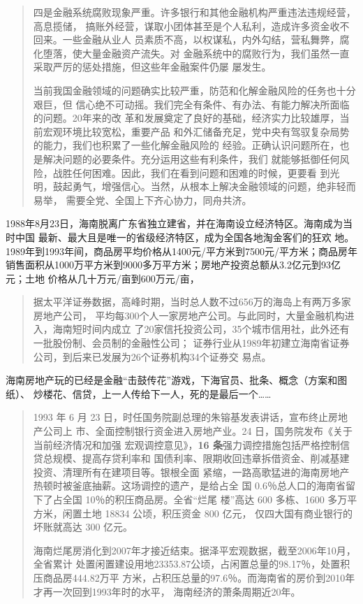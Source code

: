 \begin{quotation}
  四是金融系统腐败现象严重。许多银行和其他金融机构严重违法违规经营，高息揽储，
  搞账外经营，谋取小团体甚至是个人私利，造成许多资金收不回来。一些金融从业人
  员素质不高，以权谋私，内外勾结，营私舞弊，腐化堕落，使大量金融资产流失。对
  金融系统中的腐败行为，我们虽然一直采取严厉的惩处措施，但这些年金融案件仍屡
  屡发生。

  当前我国金融领域的问题确实比较严重，防范和化解金融风险的任务也十分艰巨，但
  信心绝不可动摇。我们完全有条件、有办法、有能力解决所面临的问题。20年来的改
  革和发展奠定了良好的基础，经济实力比较雄厚，当前宏观环境比较宽松，重要产品
  和外汇储备充足，党中央有驾驭复杂局势的能力，我们也积累了一些化解金融风险的
  经验。正确认识问题所在，也是解决问题的必要条件。充分运用这些有利条件，我们
  就能够抵御任何风险，战胜任何困难。因此，我们在看到问题和困难的时候，更要看
  到光明，鼓起勇气，增强信心。当然，从根本上解决金融领域的问题，绝非轻而易举，
  需要全党、全国上下齐心协力，同舟共济。
\end{quotation}

1988年8月23日，海南脱离广东省独立建省，并在海南设立经济特区。海南成为当时中国
最新、最大且是唯一的省级经济特区，成为全国各地淘金客们的狂欢
地。1989年到1993年间，商品房平均价格从1400元/平方米到7500元/平方米；商品房年
销售面积从1000万平方米到9000多万平方米；房地产投资总额从3.2亿元到93亿元；土地
价格从几十万元/亩到600万元/亩，


\begin{quotation}
  据太平洋证券数据，高峰时期，当时总人数不过656万的海岛上有两万多家房地产公司，
  平均每300个人一家房地产公司。与此同时，大量金融机构进入，海南短时间内成立
  了20家信托投资公司，35个城市信用社，此外还有一批股份制、会员制的金融性公司；
  证券行业从1989年初建立海南省证券公司，到后来已发展为26个证券机构34个证券交
  易点。
\end{quotation}
海南房地产玩的已经是金融“击鼓传花”游戏，下海官员、批条、概念（方案和图纸）、
炒楼花、信贷，上一人传给下一人，死的是最后一个……
\begin{quotation}
  1993 年 6 月 23 日，时任国务院副总理的朱镕基发表讲话，宣布终止房地产公司上
  市、全面控制银行资金进入房地产业。24 日，国务院发布《关于当前经济情况和加强
  宏观调控意见》，\textbf{16 条}强力调控措施包括严格控制信贷总规模、提高存贷利率和
  国债利率、限期收回违章拆借资金、削减基建投资、清理所有在建项目等。银根全面
  紧缩，一路高歌猛进的海南房地产热顿时被釜底抽薪。这场调控的遗产，是给占全
  国 0.6％总人口的海南省留下了占全国 10％的积压商品房。全省“烂尾
  楼”高达 600 多栋、1600 多万平方米，闲置土地 18834 公顷，积压资金 800 亿元，
  仅四大国有商业银行的坏账就高达 300 亿元。

  海南烂尾房消化到2007年才接近结束。据泽平宏观数据，截至2006年10月，全省累计
  处置闲置建设用地23353.87公顷，占闲置总量的98.17％，处置积压商品房444.82万平
  方米，占积压总量的97.6％。而海南省的房价到2010年才再一次回到1993年时的水平，
  海南经济的萧条周期近20年。
\end{quotation}



